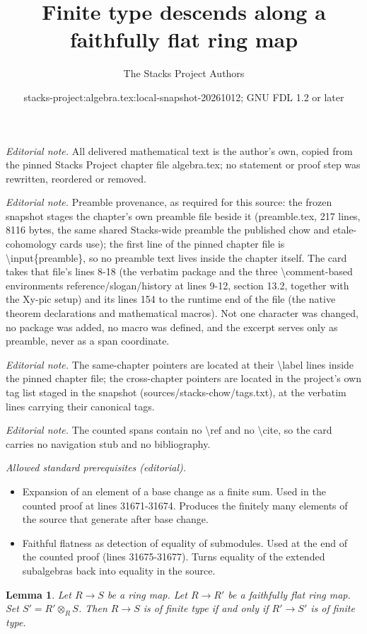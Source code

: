 \documentclass[10pt,a4paper]{amsart}
\title{Finite type descends along a faithfully flat ring map}
\author{The Stacks Project Authors}
\date{stacks-project:algebra.tex:local-snapshot-20261012; GNU FDL 1.2 or later}
\theoremstyle{plain}
\newtheorem{lemma}[subsection]{Lemma}
\theoremstyle{definition}
\theoremstyle{remark}
\numberwithin{equation}{subsection}
\begin{document}
\maketitle
\noindent\textit{Editorial note.} All delivered mathematical text is the author's own, copied from the pinned Stacks Project chapter file algebra.tex; no statement or proof step was rewritten, reordered or removed.\par\medskip
\noindent\textit{Editorial note.} Preamble provenance, as required for this source: the frozen snapshot stages the chapter's own preamble file beside it (preamble.tex, 217 lines, 8116 bytes, the same shared Stacks-wide preamble the published chow and etale-cohomology cards use); the first line of the pinned chapter file is \textbackslash{}input\{preamble\}, so no preamble text lives inside the chapter itself. The card takes that file's lines 8-18 (the verbatim package and the three \textbackslash{}comment-based environments reference/slogan/history at lines 9-12, section 13.2, together with the Xy-pic setup) and its lines 154 to the runtime end of the file (the native theorem declarations and mathematical macros). Not one character was changed, no package was added, no macro was defined, and the excerpt serves only as preamble, never as a span coordinate.\par\medskip
\noindent\textit{Editorial note.} The same-chapter pointers are located at their \textbackslash{}label lines inside the pinned chapter file; the cross-chapter pointers are located in the project's own tag list staged in the snapshot (sources/stacks-chow/tags.txt), at the verbatim lines carrying their canonical tags.\par\medskip
\noindent\textit{Editorial note.} The counted spans contain no \textbackslash{}ref and no \textbackslash{}cite, so the card carries no navigation stub and no bibliography.\par\medskip
\noindent\textit{Allowed standard prerequisites (editorial).}\begin{itemize}
\item Expansion of an element of a base change as a finite sum. Used in the counted proof at lines 31671-31674. Produces the finitely many elements of the source that generate after base change.
\item Faithful flatness as detection of equality of submodules. Used at the end of the counted proof (lines 31675-31677). Turns equality of the extended subalgebras back into equality in the source.
\end{itemize}\medskip
\begin{lemma}
\label{lemma-finite-type-descends}
Let $R \to S$ be a ring map.
Let $R \to R'$ be a faithfully flat ring map.
Set $S' = R'\otimes_R S$.
Then $R \to S$ is of finite type if and only if $R' \to S'$
is of finite type.
\end{lemma}
\end{document}
